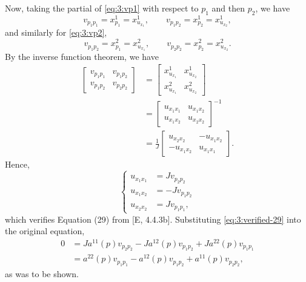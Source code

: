 \begin{solution}
  Now, taking the partial of \eqref{eq:3:vp1} with respect to \(p_1\) and
  then \(p_2\), we have
  \[
    v_{p_1p_1}=x^1_{p_1}=x^1_{u_{x_1}}, \qquad
    v_{p_1p_2}=x^1_{p_2}=x^1_{u_{x_2}},
  \]
  and similarly for \eqref{eq:3:vp2},
  \[
    v_{p_1p_2}=x^2_{p_1}=x^2_{u_{x_1}},\qquad
    v_{p_2p_2}=x^2_{p_2}=x^2_{u_{x_2}}.
  \]
  By the inverse function theorem, we have
  \begin{align*}
    \begin{bmatrix}
      v_{p_1p_1}&v_{p_1p_2}\\
      v_{p_1p_2}&v_{p_2p_2}
    \end{bmatrix}
    &=
      \begin{bmatrix}
        x^1_{u_{x_1}}&x^1_{u_{x_2}}\\
        x^2_{u_{x_1}}&x^2_{u_{x_2}}
      \end{bmatrix}
    \\
    &=\begin{bmatrix}
      u_{x_1x_1}&u_{x_1x_2}\\
      u_{x_1x_2}&u_{x_2x_2}
    \end{bmatrix}^{-1}\\
    &=\frac{1}{J}
      \begin{bmatrix}
      u_{x_2x_2}&-u_{x_1x_2}\\
      -u_{x_1x_2}&u_{x_1x_1}
    \end{bmatrix}.
  \end{align*}
  Hence,
  \begin{equation}
    \label{eq:3:verified-29}
    \left\{
      \begin{aligned}
        u_{x_1x_1}&=Jv_{p_2p_2}\\
        u_{x_1x_2}&=-Jv_{p_1p_2}\\
        u_{x_2x_2}&=Jv_{p_1p_1},
      \end{aligned}
    \right.
  \end{equation}
  which verifies Equation (29) from [E, 4.4.3b]. Substituting
  \eqref{eq:3:verified-29} into the original equation,
  \begin{align*}
    0&=Ja^{11}(p)v_{p_2p_2}-Ja^{12}(p)v_{p_1p_2}+Ja^{22}(p)v_{p_1p_1}\\
     &=a^{22}(p)v_{p_1p_1}-a^{12}(p)v_{p_1p_2}+a^{11}(p)v_{p_2p_2},
  \end{align*}
  as was to be shown.
\end{solution}

